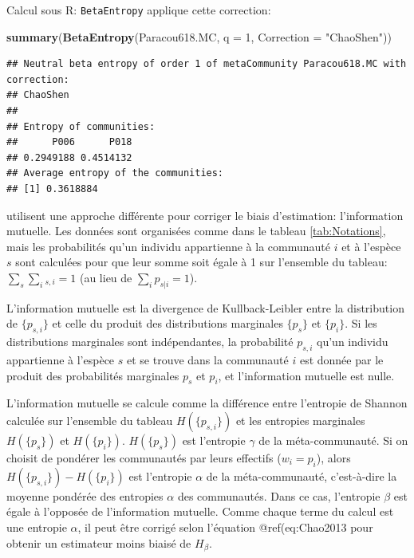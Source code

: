 \documentclass[
  11pt,
  french,
  a4paper,
  extrafontsizes,onecolumn,openright
  ]{memoir}
\newenvironment{Shaded}{\begin{snugshade}}{\end{snugshade}}
\newcommand{\DataTypeTok}[1]{\textcolor[rgb]{0.13,0.29,0.53}{#1}}
\newcommand{\DecValTok}[1]{\textcolor[rgb]{0.00,0.00,0.81}{#1}}
\newcommand{\KeywordTok}[1]{\textcolor[rgb]{0.13,0.29,0.53}{\textbf{#1}}}
\newcommand{\NormalTok}[1]{#1}
\newcommand{\StringTok}[1]{\textcolor[rgb]{0.31,0.60,0.02}{#1}}
\begin{document}
Calcul sous R: \texttt{BetaEntropy} applique cette correction:

\scriptsize

\begin{Shaded}
\begin{Highlighting}[]
\KeywordTok{summary}\NormalTok{(}\KeywordTok{BetaEntropy}\NormalTok{(Paracou618.MC, }\DataTypeTok{q =} \DecValTok{1}\NormalTok{, }\DataTypeTok{Correction =} \StringTok{"ChaoShen"}\NormalTok{))}
\end{Highlighting}
\end{Shaded}

\begin{verbatim}
## Neutral beta entropy of order 1 of metaCommunity Paracou618.MC with correction: 
## ChaoShen 
## 
## Entropy of communities: 
##      P006      P018 
## 0.2949188 0.4514132 
## Average entropy of the communities: 
## [1] 0.3618884
\end{verbatim}

\normalsize

\textcite{Chao2013} utilisent une approche différente pour corriger le biais d'estimation: l'information mutuelle.
Les données sont organisées comme dans le tableau \ref{tab:Notations}, mais les probabilités qu'un individu appartienne à la communauté \(i\) et à l'espèce \(s\) sont calculées pour que leur somme soit égale à 1 sur l'ensemble du tableau: \(\sum_s{\sum_i{_{s,i}}}=1\) (au lieu de \(\sum_i{p_{s|i}}=1\)).

L'information mutuelle est la divergence de Kullback-Leibler entre la distribution de \(\{p_{s,i}\}\) et celle du produit des distributions marginales \(\{p_s\}\) et \(\{p_i\}\).
Si les distributions marginales sont indépendantes, la probabilité \(p_{s,i}\) qu'un individu appartienne à l'espèce \(s\) et se trouve dans la communauté \(i\) est donnée par le produit des probabilités marginales \(p_s\) et \(p_i\), et l'information mutuelle est nulle.

L'information mutuelle se calcule comme la différence entre l'entropie de Shannon calculée sur l'ensemble du tableau \(H(\{p_{s,i}\})\) et les entropies marginales \(H(\{p_s\})\) et \(H(\{p_i\})\).
\(H(\{p_s\})\) est l'entropie \(\gamma\) de la méta-communauté.
Si on choisit de pondérer les communautés par leurs effectifs (\(w_i=p_i\)), alors \(H(\{p_{s,i}\})-H(\{p_i\})\) est l'entropie \(\alpha\) de la méta-communauté, c'est-à-dire la moyenne pondérée des entropies \(\alpha\) des communautés.
Dans ce cas, l'entropie \(\beta\) est égale à l'opposée de l'information mutuelle.
Comme chaque terme du calcul est une entropie \(\alpha\), il peut être corrigé selon l'équation @ref(eq:Chao2013 pour obtenir un estimateur moins biaisé de \(H_{\beta}\).
\end{document}
